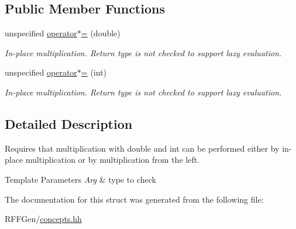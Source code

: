 \subsection*{Public Member Functions}
\begin{DoxyCompactItemize}
\item 
\hypertarget{structRFFGen_1_1Concepts_1_1MultiplyWithArithmeticFromLeftConcept_ac7becd3ba4b0a7f81c2f83bfef9bad8c}{unspecified \hyperlink{structRFFGen_1_1Concepts_1_1MultiplyWithArithmeticFromLeftConcept_ac7becd3ba4b0a7f81c2f83bfef9bad8c}{operator$\ast$=} (double)}\label{structRFFGen_1_1Concepts_1_1MultiplyWithArithmeticFromLeftConcept_ac7becd3ba4b0a7f81c2f83bfef9bad8c}

\begin{DoxyCompactList}\small\item\em In-\/place multiplication. Return type is not checked to support lazy evaluation. \end{DoxyCompactList}\item 
\hypertarget{structRFFGen_1_1Concepts_1_1MultiplyWithArithmeticFromLeftConcept_af46b7b8e72ef559e6667e104ec745359}{unspecified \hyperlink{structRFFGen_1_1Concepts_1_1MultiplyWithArithmeticFromLeftConcept_af46b7b8e72ef559e6667e104ec745359}{operator$\ast$=} (int)}\label{structRFFGen_1_1Concepts_1_1MultiplyWithArithmeticFromLeftConcept_af46b7b8e72ef559e6667e104ec745359}

\begin{DoxyCompactList}\small\item\em In-\/place multiplication. Return type is not checked to support lazy evaluation. \end{DoxyCompactList}\end{DoxyCompactItemize}


\subsection{Detailed Description}
Requires that multiplication with double and int can be performed either by in-\/place multiplication or by multiplication from the left. 


\begin{DoxyTemplParams}{Template Parameters}
{\em Arg} & type to check \\
\hline
\end{DoxyTemplParams}


The documentation for this struct was generated from the following file\-:\begin{DoxyCompactItemize}
\item 
R\-F\-F\-Gen/\hyperlink{concepts_8hh}{concepts.\-hh}\end{DoxyCompactItemize}
